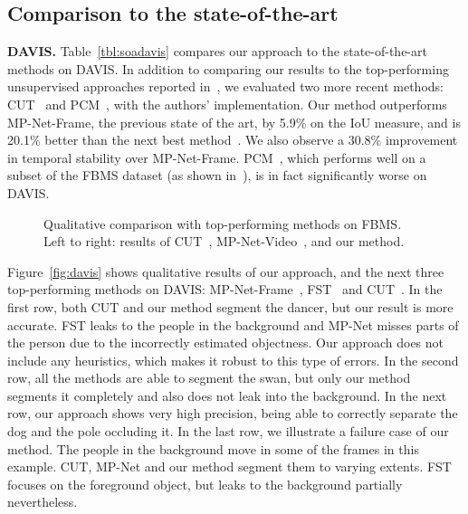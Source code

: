 \documentclass[10pt,twocolumn,letterpaper]{article}
\begin{document}
\subsection{Comparison to the state-of-the-art}
\label{sec:soa}
\vspace{0.3cm}\noindent\textbf{DAVIS.}
Table~\ref{tbl:soadavis} compares our approach to the state-of-the-art methods
on DAVIS. In addition to comparing our results to the top-performing
unsupervised approaches reported in~\cite{Perazzi16}, we evaluated two more
recent methods: CUT~\cite{keuper2015motion} and PCM~\cite{Bideau16}, with the
authors' implementation. Our method outperforms
MP-Net-Frame, the previous state of the art, by 5.9\% on the IoU measure, and
is 20.1\% better than the next best method~\cite{papazoglou2013fast}. We also
observe a 30.8\% improvement in temporal stability over MP-Net-Frame.
PCM~\cite{Bideau16}, which performs well on a subset of the FBMS dataset (as
shown in~\cite{tokmakov2016learning}), is in fact significantly worse on DAVIS.

\begin{figure}[t]
\begin{center}
\vspace{0.1cm}
\vspace{0.1cm}
\end{center}
\vspace{-0.3cm}\caption{Qualitative comparison with top-performing methods on
FBMS. Left to right: results of CUT~\cite{keuper2015motion},
MP-Net-Video~\cite{papazoglou2013fast}, and our method.}
\vspace{-0.4cm}
\label{fig:fbms}
\end{figure}
Figure~\ref{fig:davis} shows qualitative results of our approach, and the next
three top-performing methods on DAVIS:
MP-Net-Frame~\cite{tokmakov2016learning}, FST~\cite{papazoglou2013fast} and
CUT~\cite{keuper2015motion}. In the first row, both CUT and our method segment
the dancer, but our result is more accurate. FST leaks to the people in the
background and MP-Net misses parts of the person due to the incorrectly
estimated objectness. Our approach does not include any heuristics, which
makes it robust to this type of errors. In the second row, all the methods are
able to segment the swan, but only our method segments it completely and also
does not leak into the background. In the next row, our approach shows very
high precision, being able to correctly separate the dog and the pole occluding
it. In the last row, we illustrate a failure case of our method. The people in
the background move in some of the frames in this example. CUT, MP-Net and our
method segment them to varying extents. FST focuses on the foreground object,
but leaks to the background partially nevertheless.
\end{document}

